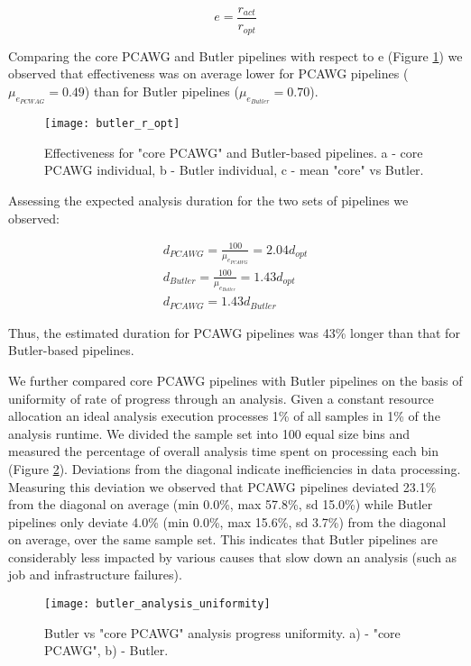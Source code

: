 \begin{equation}
	e = \frac{r_{act}}{r_{opt}}
\end{equation}

Comparing the core PCAWG and Butler pipelines with respect to e (Figure \ref{fig:butler_r_opt}) we observed that effectiveness was on average lower for PCAWG pipelines ($\mu_{e_{PCWAG}}=0.49$) than for Butler pipelines ($\mu_{e_{Butler}}=0.70$). 

\begin{figure}[H]
\texttt{[image: butler\_r\_opt]}
\centering
\caption {Effectiveness for "core PCAWG" and Butler-based pipelines. a - core PCAWG individual, b - Butler individual, c - mean "core" vs Butler. }
\label{fig:butler_r_opt}
\end{figure}
\newpage
Assessing the expected analysis duration for the two sets of pipelines we observed:

\begin{align}
	d_{PCAWG} = {\frac{100}{\mu_{e_{PCAWG}}}} = 2.04d_{opt} \\
	d_{Butler} = {\frac{100}{\mu_{e_{Butler}}}} = 1.43d_{opt} \\
	d_{PCAWG} = 1.43d_{Butler} 
\end{align}

Thus, the estimated duration for PCAWG pipelines was 43\% longer than that for Butler-based pipelines.

We further compared core PCAWG pipelines with Butler pipelines on the basis of uniformity of rate of progress through an analysis. Given a constant resource allocation an ideal analysis execution processes 1\% of all samples in 1\% of the analysis runtime. We divided the sample set into 100 equal size bins and measured the percentage of overall analysis time spent on processing each bin (Figure \ref{fig:butler_analysis_uniformity}). Deviations from the diagonal indicate inefficiencies in data processing. Measuring this deviation we observed that PCAWG pipelines deviated 23.1\% from the diagonal on average (min 0.0\%, max 57.8\%, sd 15.0\%) while Butler pipelines only deviate 4.0\% (min 0.0\%, max 15.6\%, sd 3.7\%) from the diagonal on average, over the same sample set. This indicates that Butler pipelines are considerably less impacted by various causes that slow down an analysis (such as job and infrastructure failures). 

\begin{figure}[H]
\texttt{[image: butler\_analysis\_uniformity]}
\centering
\caption {Butler vs "core PCAWG" analysis progress uniformity. a) - "core PCAWG", b) - Butler.}
\label{fig:butler_analysis_uniformity}
\end{figure}

